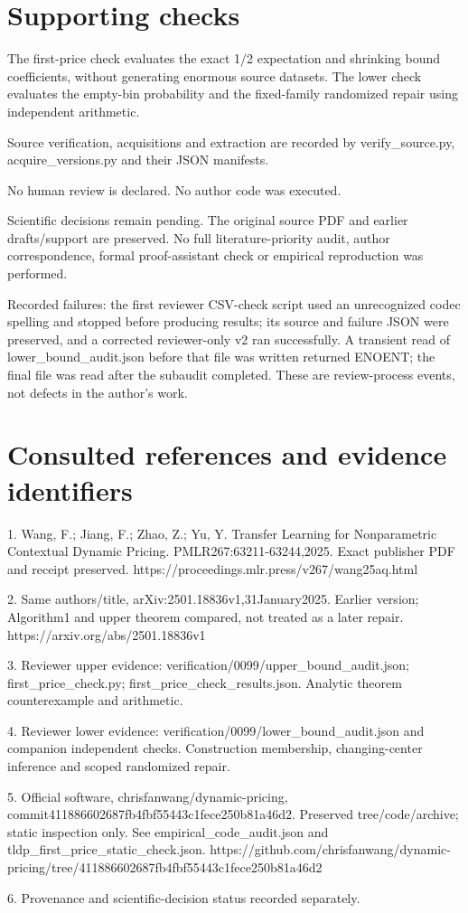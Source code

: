 \documentclass[10pt]{article}
\begin{document}
\section*{Supporting checks}
The first-price check evaluates the exact 1/2 expectation and shrinking bound coefficients, without generating enormous source datasets. The lower check evaluates the empty-bin probability and the fixed-family randomized repair using independent arithmetic.\par
Source verification, acquisitions and extraction are recorded by verify\_source.py, acquire\_versions.py and their JSON manifests.\par
No human review is declared. No author code was executed.\par
Scientific decisions remain pending. The original source PDF and earlier drafts/support are preserved. No full literature-priority audit, author correspondence, formal proof-assistant check or empirical reproduction was performed.\par
Recorded failures: the first reviewer CSV-check script used an unrecognized codec spelling and stopped before producing results; its source and failure JSON were preserved, and a corrected reviewer-only v2 ran successfully. A transient read of lower\_bound\_audit.json before that file was written returned ENOENT; the final file was read after the subaudit completed. These are review-process events, not defects in the author’s work.\par
\section*{Consulted references and evidence identifiers}
1. Wang, F.; Jiang, F.; Zhao, Z.; Yu, Y. Transfer Learning for Nonparametric Contextual Dynamic Pricing. PMLR267:63211-63244,2025. Exact publisher PDF and receipt preserved. https://proceedings.mlr.press/v267/wang25aq.html\par
2. Same authors/title, arXiv:2501.18836v1,31January2025. Earlier version; Algorithm1 and upper theorem compared, not treated as a later repair. https://arxiv.org/abs/2501.18836v1\par
3. Reviewer upper evidence: verification/0099/upper\_bound\_audit.json; first\_price\_check.py; first\_price\_check\_results.json. Analytic theorem counterexample and arithmetic.\par
4. Reviewer lower evidence: verification/0099/lower\_bound\_audit.json and companion independent checks. Construction membership, changing-center inference and scoped randomized repair.\par
5. Official software, chrisfanwang/dynamic-pricing, commit411886602687fb4fbf55443c1fece250b81a46d2. Preserved tree/code/archive; static inspection only. See empirical\_code\_audit.json and tldp\_first\_price\_static\_check.json. https://github.com/chrisfanwang/dynamic-pricing/tree/411886602687fb4fbf55443c1fece250b81a46d2\par
6. Provenance and scientific-decision status recorded separately.\par
\end{document}
